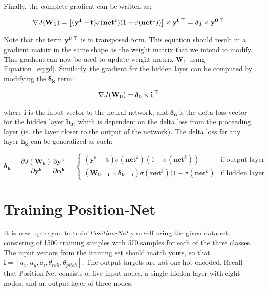 \documentclass{article}
\begin{document}
Finally, the complete gradient can be written as:

\begin{equation}
\label{}
   \nabla J(\mathbf{W_1}) = \big[ (\mathbf{y^1} - \mathbf{t})\sigma(\mathbf{net}^1)(1 - \sigma(\mathbf{net}^1))\big] \times \mathbf{y^0} \thinspace ^\top = \mathbf{\boldsymbol{\delta}_{1}} \times \mathbf{y^0} \thinspace ^\top
\end{equation}

Note that the term $\mathbf{y^0} \thinspace ^\top$ is in transposed form. This equation should result in a gradient matrix in the same shape as the weight matrix that we intend to modify. This gradient can now be used to update weight matrix $\mathbf{W_1}$ using Equation~\ref{eq:gd}. Similarly, the gradient for the hidden layer can be computed by modifying the $\mathbf{\boldsymbol{\delta}_{k}}$ term:

\begin{equation}
\label{}
   \nabla J(\mathbf{W_0}) = \mathbf{\boldsymbol{\delta}_{0}} \times \mathbf{i} \thinspace ^\top
\end{equation}

where $\mathbf{i}$ is the input vector to the neural network, and $\mathbf{\boldsymbol{\delta}_0}$ is the delta loss vector for the hidden layer $\mathbf{h_0}$, which is dependent on the delta loss from the proceeding layer (ie. the layer closer to the output of the network). The delta loss for any layer $\mathbf{h_k}$ can be generalized as such:

\begin{equation}
\label{}
   \mathbf{\boldsymbol{\delta}_k} = \frac{\partial J(\mathbf{W_k})}{\partial \mathbf{y^k}} \frac{\partial \mathbf{y^{k}}}{\partial \mathbf{\boldsymbol{\alpha}^k}} = \begin{cases}
            (\mathbf{y^k} - \mathbf{t})\sigma(\mathbf{net}^k)(1 - \sigma(\mathbf{net}^k)) & \text{if output layer} \\
            (\mathbf{W_{k+1}} \times \mathbf{\boldsymbol{\delta}_{k+1}})\sigma(\mathbf{net}^k)(1 - \sigma(\mathbf{net}^k) & \text{if hidden layer}
        \end{cases}
\end{equation}

\section{Training Position-Net}

It is now up to you to train \textit{Position-Net} yourself using the given data set, consisting of 1500 training samples with 500 samples for each of the three classes. The input vectors from the training set should match yours, so that $\mathbf{i} = [a_x, a_y, a_z, \theta_{roll}, \theta_{pitch}]$. The output targets are not one-hot encoded. Recall that Position-Net consists of five input nodes, a single hidden layer with eight nodes, and an output layer of three nodes. 
\end{document}
